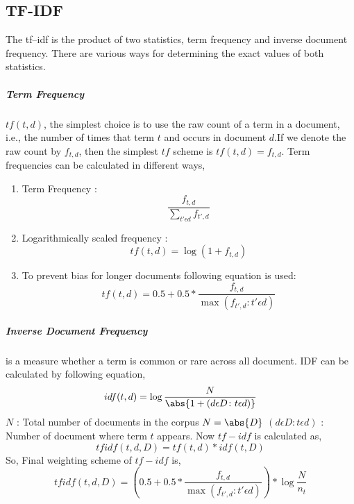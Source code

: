 \subsection{TF-IDF}
The tf–idf is the product of two statistics, term frequency and inverse document frequency. There are various ways for determining the exact values of both statistics.

\subparagraph{Term Frequency}$tf(t,d)$, the simplest choice is to use the raw count of a term in a document, i.e., the number of times that term $t$ and occurs in document $d$.If we denote the raw count by $f_{t,d}$, then the simplest $tf$ scheme is $tf(t,d) = f_{t,d}$. Term frequencies can be calculated in  different ways,
\begin{enumerate}
    \item Term Frequency : 
    \begin{equation}
        \dfrac{f_{t,d}}{\sum_{t'\epsilon d}^{}f_{t',d}}
    \end{equation}
    \item Logarithmically scaled frequency :
    \begin{equation}
         tf(t,d)=\log(1+f_{t,d})
    \end{equation}
   
    \item To prevent bias for longer documents following equation is used:
    \begin{equation}
        tf(t,d) = 0.5 + 0.5 * \frac{f_{t,d}}{\max{(f_{t',d}\colon t'\epsilon d)}}
    \end{equation}
\end{enumerate}

\subparagraph{Inverse Document Frequency}
is a measure whether a term is common or rare across all document. IDF can be calculated by following equation,
\begin{equation}
    idf(t,d) = \log \frac{N}{\abs{1+(d\epsilon D\colon t\epsilon d)}}
\end{equation}
\noindent
$N$ : Total number of documents in the corpus $N = \abs{D}$\newline
$(d \epsilon D\colon t\epsilon d)$ : \textrm{Number of document where term $t$ appears.}\newline
\vspace{0.5cm}
Now $tf-idf$ is calculated as,
\begin{equation}
    tfidf(t, d, D) = tf(t, d)*idf(t, D)
\end{equation}
So, Final weighting scheme of $tf-idf$ is,
\begin{equation}
        tfidf(t, d, D)=(0.5 + 0.5 * \frac{f_{t,d}}{\max{(f_{t',d}\colon t'\epsilon d)}})*\log \frac{N}{n_t}
\end{equation}
\clearpage

